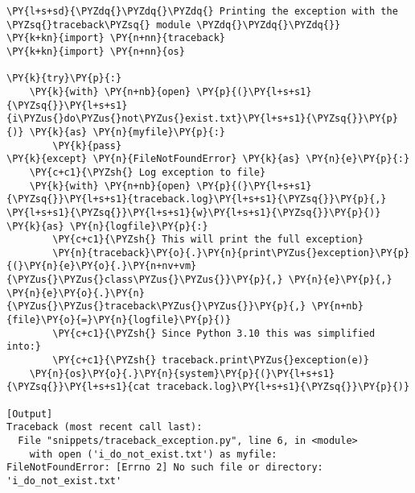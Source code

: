 \begin{Verbatim}[label=\makebox{\url{https://github.com/lucabaldini/cmepda/tree/master/slides/latex/snippets/traceback\_exception.py}},commandchars=\\\{\}]
\PY{l+s+sd}{\PYZdq{}\PYZdq{}\PYZdq{} Printing the exception with the \PYZsq{}traceback\PYZsq{} module \PYZdq{}\PYZdq{}\PYZdq{}}
\PY{k+kn}{import} \PY{n+nn}{traceback}
\PY{k+kn}{import} \PY{n+nn}{os}

\PY{k}{try}\PY{p}{:}
    \PY{k}{with} \PY{n+nb}{open} \PY{p}{(}\PY{l+s+s1}{\PYZsq{}}\PY{l+s+s1}{i\PYZus{}do\PYZus{}not\PYZus{}exist.txt}\PY{l+s+s1}{\PYZsq{}}\PY{p}{)} \PY{k}{as} \PY{n}{myfile}\PY{p}{:}
        \PY{k}{pass}
\PY{k}{except} \PY{n}{FileNotFoundError} \PY{k}{as} \PY{n}{e}\PY{p}{:}
    \PY{c+c1}{\PYZsh{} Log exception to file}
    \PY{k}{with} \PY{n+nb}{open} \PY{p}{(}\PY{l+s+s1}{\PYZsq{}}\PY{l+s+s1}{traceback.log}\PY{l+s+s1}{\PYZsq{}}\PY{p}{,} \PY{l+s+s1}{\PYZsq{}}\PY{l+s+s1}{w}\PY{l+s+s1}{\PYZsq{}}\PY{p}{)} \PY{k}{as} \PY{n}{logfile}\PY{p}{:}
        \PY{c+c1}{\PYZsh{} This will print the full exception}
        \PY{n}{traceback}\PY{o}{.}\PY{n}{print\PYZus{}exception}\PY{p}{(}\PY{n}{e}\PY{o}{.}\PY{n+nv+vm}{\PYZus{}\PYZus{}class\PYZus{}\PYZus{}}\PY{p}{,} \PY{n}{e}\PY{p}{,} \PY{n}{e}\PY{o}{.}\PY{n}{\PYZus{}\PYZus{}traceback\PYZus{}\PYZus{}}\PY{p}{,} \PY{n+nb}{file}\PY{o}{=}\PY{n}{logfile}\PY{p}{)}
        \PY{c+c1}{\PYZsh{} Since Python 3.10 this was simplified into:}
        \PY{c+c1}{\PYZsh{} traceback.print\PYZus{}exception(e)}
    \PY{n}{os}\PY{o}{.}\PY{n}{system}\PY{p}{(}\PY{l+s+s1}{\PYZsq{}}\PY{l+s+s1}{cat traceback.log}\PY{l+s+s1}{\PYZsq{}}\PY{p}{)}

[Output]
Traceback (most recent call last):
  File "snippets/traceback_exception.py", line 6, in <module>
    with open ('i_do_not_exist.txt') as myfile:
FileNotFoundError: [Errno 2] No such file or directory: 'i_do_not_exist.txt'
\end{Verbatim}